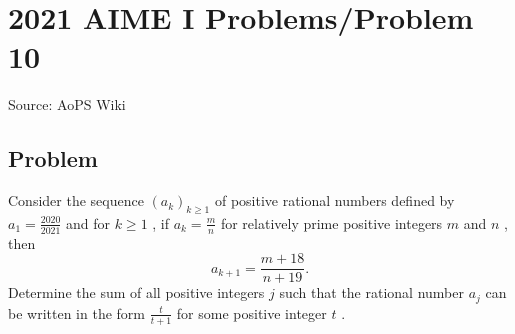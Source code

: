 \documentclass[12pt]{article}
\begin{document}
\section*{{2021 AIME I Problems/Problem 10}}
Source: AoPS Wiki

\subsection*{Problem}
Consider the sequence $(a_k)_{k\ge 1}$ of positive rational numbers defined by $a_1 = \frac{2020}{2021}$ and for $k\ge 1$ , if $a_k = \frac{m}{n}$ for relatively prime positive integers $m$ and $n$ , then \[a_{k+1} = \frac{m + 18}{n+19}.\] Determine the sum of all positive integers $j$ such that the rational number $a_j$ can be written in the form $\frac{t}{t+1}$ for some positive integer $t$ .
\end{document}
